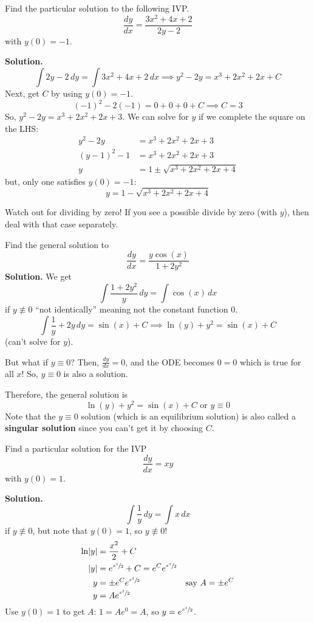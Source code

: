 \begin{Example}{}{}
    Find the particular solution to the following IVP\@.
    \[ \frac{dy}{dx} =\frac{3x^2+4x+2}{2y-2} \]
    with $ y(0)=-1 $.

    \textbf{Solution.}
    \[ \int 2y-2\, d{y} =\int 3x^2+4x+2\, d{x} \implies y^2-2y=x^3+2x^2+2x+C \]
    Next, get $ C $ by using $ y(0)=-1 $.
    \[ (-1)^2-2(-1)=0+0+0+C\implies C=3 \]
    So, $ y^2-2y=x^3+2x^2+2x+3 $. We can solve for $ y $ if we complete the square
    on the LHS\@:
    \begin{align*}
        y^2-2y    & =  x^3+2x^2+2x+3           \\
        (y-1)^2-1 & = x^3+2x^2+2x+3            \\
        y         & = 1\pm\sqrt{x^3+2x^2+2x+4}
    \end{align*}
    but, only one satisfies $ y(0)=-1 $:
    \[ y=1-\sqrt{x^3+2x^2+2x+4} \]
\end{Example}

\begin{Remark}{}{}
    Watch out for dividing by zero! If you see a possible divide
    by zero (with $ y $), then deal with that case separately.
\end{Remark}

\begin{Example}{}{}
    Find the general solution to
    \[ \frac{dy}{dx}=\frac{y\cos(x)}{1+2y^2} \]
    \textbf{Solution.} We get
    \[ \int \frac{1+2y^2}{y} \, d{y} =\int \cos(x)\, d{x} \]
    if $ y\not\equiv 0 $ ``not identically'' meaning not the constant function $ 0 $.
    \[ \int \frac{1}{y} +2y\, d{y} =\sin(x)+C\implies \ln(y)+y^2=\sin(x)+C \]
    (can't solve for $ y $).

    But what if $ y\equiv 0 $? Then, $ \frac{dy}{dx} =0 $, and the ODE becomes
    $ 0=0 $ which is true for all $ x $! So, $ y\equiv 0 $ is also a solution.

    Therefore, the general solution is
    \[ \ln(y)+y^2=\sin(x)+C \text{ or }y\equiv 0 \]
    Note that the $ y\equiv 0 $ solution (which is an equilibrium solution) is also
    called a \textbf{singular solution} since you can't get it by choosing $ C $.
\end{Example}

\begin{Example}{}{}
    Find a particular solution for the IVP
    \[ \frac{dy}{dx} =xy \]
    with $ y(0)=1 $.

    \textbf{Solution.}
    \[ \int \frac{1}{y} \, d{y} =\int x\, d{x} \]
    if $ y\not\equiv 0 $, but note that $ y(0)=1 $, so $ y\not\equiv 0 $!
    \begin{align*}
        \ln\lvert y\rvert & =\frac{x^2}{2} +C                                                    \\
        \lvert y\rvert    & =e^{\sfrac{x^2}{2}}+C=e^C e^{\sfrac{x^2}{2}}                         \\
        y          & =\pm e^C e^{\sfrac{x^2}{2}}                  & \text{say } A=\pm e^C \\
        y          & =Ae^{\sfrac{x^2}{2}}
    \end{align*}
    Use $ y(0)=1 $ to get $ A $: $ 1=Ae^0=A $, so $ y=e^{\sfrac{x^2}{2}} $.
\end{Example}

